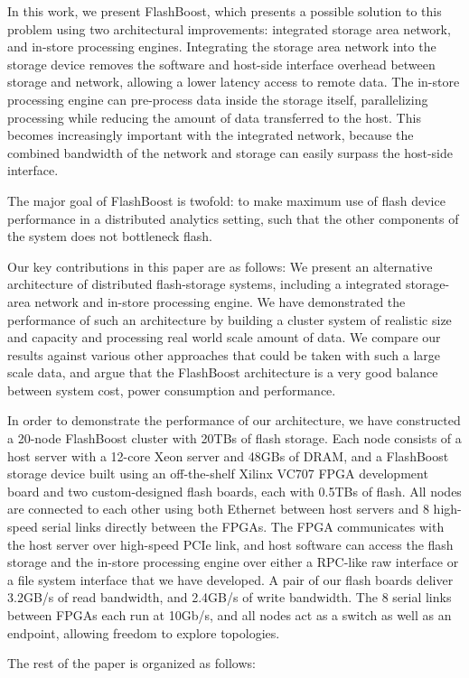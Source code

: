 In this work, we present FlashBoost, which presents a possible solution to this
problem using two architectural improvements: integrated storage area network,
and in-store processing engines. Integrating the storage area network into the
storage device removes the software and host-side interface overhead between
storage and network, allowing a lower latency access to remote data.  
The in-store processing engine can pre-process data inside the storage itself,
parallelizing processing while reducing the amount of data transferred to the
host. This becomes increasingly important with the integrated network, because
the combined bandwidth of the network and storage can easily surpass the
host-side interface.

The major goal of FlashBoost is twofold: to make maximum use of flash device
performance in a distributed analytics setting, such that the other components
of the system does not bottleneck flash. 

Our key contributions in this paper are as follows: We present an alternative
architecture of distributed flash-storage systems, including a integrated
storage-area network and in-store processing engine.
We have demonstrated the performance of such an architecture by building a
cluster system of realistic size and capacity and processing real world scale
amount of data. We compare our results against various other approaches that
could be taken with such a large scale data, and argue that the FlashBoost
architecture is a very good balance between system cost, power consumption and
performance.

In order to demonstrate the performance of our architecture, we have constructed
a 20-node FlashBoost cluster with 20TBs of flash storage. Each node consists of
a host server with a 12-core Xeon server and 48GBs of DRAM, and a FlashBoost
storage device built using an off-the-shelf Xilinx VC707 FPGA development board
and two custom-designed flash boards, each with 0.5TBs of flash. All nodes are
connected to each other using both Ethernet between host servers and 8
high-speed serial links directly between the FPGAs. The FPGA communicates with
the host server over high-speed PCIe link, and host software can access the
flash storage and the in-store processing engine over either a RPC-like raw
interface or a file system interface that we have developed. A pair of our flash
boards deliver 3.2GB/s of read bandwidth, and 2.4GB/s of write bandwidth.  The 8
serial links between FPGAs each run at 10Gb/s, and all nodes act as a switch as
well as an endpoint, allowing freedom to explore topologies.

The rest of the paper is organized as follows:
